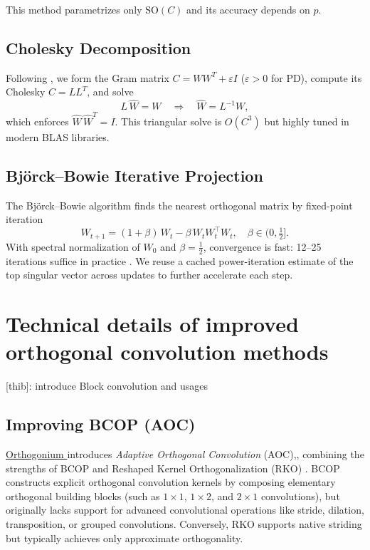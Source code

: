 \documentclass[10pt]{article}
\theoremstyle{plain}
\theoremstyle{definition}
\theoremstyle{remark}
\newcommand{\thib}[1]{{\color{blue}[thib]: #1}}
\newcommand{\thib}[1]{}
\newcommand{\Orthogonium}{ \href{https://github.com/deel-ai/orthogonium/}{Orthogonium }}
\begin{document}
This method parametrizes only \(\mathrm{SO}(C)\) and its accuracy depends on \(p\).

\subsection{Cholesky Decomposition}

Following \cite{hu_recipe_2023}, we form the Gram matrix \(C = W W^T + \varepsilon I\) (\(\varepsilon>0\) for PD), compute its Cholesky \(C = L L^T\), and solve
\[
  L\,\hat W = W \quad\Longrightarrow\quad \hat W = L^{-1} W,
\]
which enforces \(\hat W\,\hat W^T = I\).  This triangular solve is \(O(C^3)\) but highly tuned in modern BLAS libraries.

\subsection{Björck–Bowie Iterative Projection}

The Björck–Bowie algorithm \cite{bjorck1971iterative} finds the nearest orthogonal matrix by fixed-point iteration
\[
  W_{t+1} = (1+\beta)\,W_t - \beta\,W_t W_t^\top W_t,
  \quad \beta\in\bigl(0,\tfrac12\bigr].
\]
With spectral normalization of \(W_0\) and \(\beta=\tfrac12\), convergence is fast: 12–25 iterations suffice in practice \cite{anil_sorting_2019}.  We reuse a cached power-iteration estimate of the top singular vector across updates to further accelerate each step.

\section{Technical details of improved orthogonal convolution methods}\label{sec:technical_details}

    \thib{introduce Block convolution and usages}

    \subsection{Improving BCOP (AOC)\cite{boissin2025adaptive}}

    \Orthogonium introduces \textit{Adaptive Orthogonal Convolution} (AOC),\cite{boissin2025adaptive}, combining the strengths of BCOP \cite{li_preventing_2019} and Reshaped Kernel Orthogonalization (RKO) \cite{serrurier_achieving_2021}. BCOP constructs explicit orthogonal convolution kernels by composing elementary orthogonal building blocks (such as $1\times 1$, $1\times 2$, and $2\times 1$ convolutions), but originally lacks support for advanced convolutional operations like stride, dilation, transposition, or grouped convolutions. Conversely, RKO supports native striding but typically achieves only approximate orthogonality.
    
\end{document}
